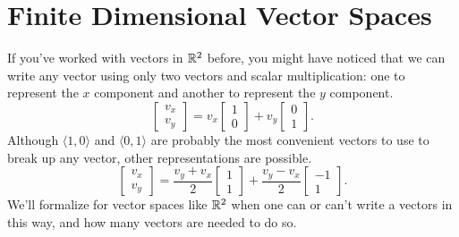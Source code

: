 \chapter{Finite Dimensional Vector Spaces}

If you've worked with vectors in $\mathbb{R}^2$ before, you might have noticed that we can write any vector using only two vectors and scalar multiplication: one to represent the $x$ component and another to represent the $y$ component.
\begin{equation*}
	\begin{bmatrix}
		v_x \\ v_y
	\end{bmatrix} = v_x \begin{bmatrix}
		1 \\ 0
	\end{bmatrix} + v_y \begin{bmatrix}
		0 \\ 1
	\end{bmatrix}.
\end{equation*}
Although $\langle 1, 0 \rangle$ and $\langle 0, 1 \rangle$ are probably the most convenient vectors to use to break up any vector, other representations are possible.
\begin{equation*}
	\begin{bmatrix}
		v_x \\ v_y
	\end{bmatrix} = \frac{v_y + v_x}{2} \begin{bmatrix}
		1 \\ 1
	\end{bmatrix} + \frac{v_y - v_x}{2} \begin{bmatrix}
		-1 \\ 1
	\end{bmatrix}.
\end{equation*}
We'll formalize for vector spaces like $\mathbb{R}^2$ when one can or can't write a vectors in this way, and how many vectors are needed to do so.


